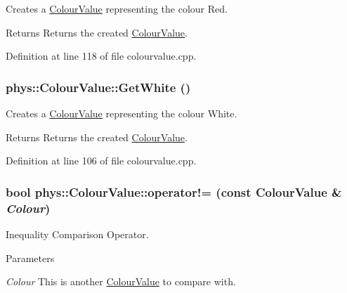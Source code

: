 Creates a \hyperlink{classphys_1_1ColourValue}{ColourValue} representing the colour Red. 

\begin{DoxyReturn}{Returns}
Returns the created \hyperlink{classphys_1_1ColourValue}{ColourValue}. 
\end{DoxyReturn}


Definition at line 118 of file colourvalue.cpp.

\hypertarget{classphys_1_1ColourValue_a77d1204bea0f2f07338d46317d644f6b}{
\subsubsection[{GetWhite}]{ phys::ColourValue::GetWhite ()}}
\label{d3/db0/classphys_1_1ColourValue_a77d1204bea0f2f07338d46317d644f6b}


Creates a \hyperlink{classphys_1_1ColourValue}{ColourValue} representing the colour White. 

\begin{DoxyReturn}{Returns}
Returns the created \hyperlink{classphys_1_1ColourValue}{ColourValue}. 
\end{DoxyReturn}


Definition at line 106 of file colourvalue.cpp.

\hypertarget{classphys_1_1ColourValue_a06b52ce51b723ea733f2b067b03530a5}{
\subsubsection[{operator!=}]{\setlength{\rightskip}{0pt plus 5cm}bool phys::ColourValue::operator!= (const {\bf ColourValue} \& {\em Colour})}}
\label{d3/db0/classphys_1_1ColourValue_a06b52ce51b723ea733f2b067b03530a5}


Inequality Comparison Operator. 


\begin{DoxyParams}{Parameters}
\item[{\em Colour}]This is another \hyperlink{classphys_1_1ColourValue}{ColourValue} to compare with. \end{DoxyParams}


